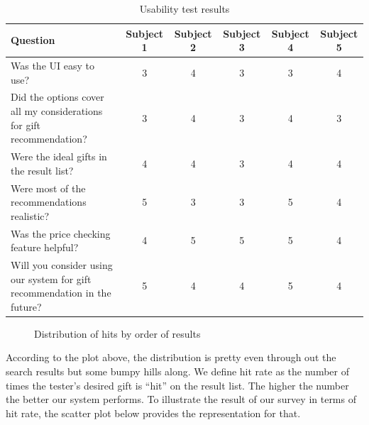 \documentclass[11pt,twocolumn]{article}
\begin{document}
\begin{table}[ht]
\caption{Usability test results}
\centering
\begin{tabular}{| p{5cm} | c | c | c | c | c |}
\hline
Question & Subject 1 & Subject 2 & Subject 3 & Subject 4 & Subject 5 \\
\hline
Was the UI easy to use? & 3 & 4 & 3 & 3 & 4 \\
\hline
Did the options cover all my considerations for gift recommendation? & 3 & 4 & 3 & 4 & 3 \\
\hline
Were the ideal gifts in the result list? & 4 & 4 & 3 & 4 & 4 \\
\hline
Were most of the recommendations realistic? & 5 & 3 & 3 & 5 & 4 \\
\hline
Was the price checking feature helpful? & 4 & 5 & 5 & 5 & 4 \\
\hline
Will you consider using our system for gift recommendation in the future? & 5 & 4 & 4 & 5 & 4 \\
\hline
\end{tabular}
\label{table:usetest}
\end{table}

\begin{figure}[h!t]
\caption{Distribution of hits by order of results}
\label{hit}
\end{figure}

According to the plot above, the distribution is pretty even through out the search results but some bumpy hills along. We define hit rate as the number of times the tester's desired gift is ``hit'' on the result list. The higher the number the better our system performs. To illustrate the result of our survey in terms of hit rate, the scatter plot below provides the representation for that.
\end{document}
